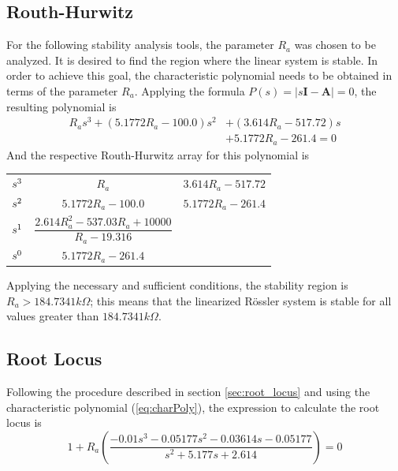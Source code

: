 \subsection{Routh-Hurwitz}
For the following stability analysis tools, the parameter $R_a$ was chosen to be analyzed. It is desired to find the region where the linear system is stable. In order to achieve this goal, the characteristic polynomial needs to be obtained in terms of the parameter $R_a$. Applying the formula $P(s)=|s\mathbf{I}-\mathbf{A}|=0$, the resulting polynomial is
\begin{equation}\label{eq:charPoly}
    \begin{split}
        R_as^3 + (5.1772R_a - 100.0)s^2 &+ (3.614R_a - 517.72)s\\
        &+ 5.1772R_a - 261.4=0
    \end{split}
\end{equation}
And the respective Routh-Hurwitz array for this polynomial is
{\renewcommand{\arraystretch}{1.6}
\begin{table}[H]
\centering
{}
\label{tab:routhHurwitz}
\begin{tabular}{c|cc|}
$\boldmath{s^3}$  & $R_a$                                                                      & $3.614R_a - 517.72$   \\
$\boldmath{s^2}$  & $5.1772R_a - 100.0$                                                    & $5.1772R_a - 261.4$   \\ 
\cline{3-3}
$\boldmath{s^1}$  & \multicolumn{1}{c|}{$\dfrac{2.614R_a^2-537.03R_a+10000}{R_a-19.316}$ } & \multicolumn{1}{c}{}  \\
$\boldmath{s^0}$  & \multicolumn{1}{c|}{$5.1772R_a - 261.4$ }                              & \multicolumn{1}{c}{}  \\
\cline{2-2}
\end{tabular}
\end{table}}

Applying the necessary and sufficient conditions, the stability region is $R_a>184.7341k\Omega$; this means that the linearized Rössler system is stable for all values greater than $184.7341k\Omega$.

\subsection{Root Locus}
Following the procedure described in section \ref{sec:root_locus} and using the characteristic polynomial (\ref{eq:charPoly}), the expression to calculate the root locus is
\begin{equation}
    1+R_a\left(\frac{-0.01 s^3 - 0.05177 s^2 - 0.03614 s - 0.05177}{ s^2 + 5.177 s + 2.614}\right)=0
\end{equation}

